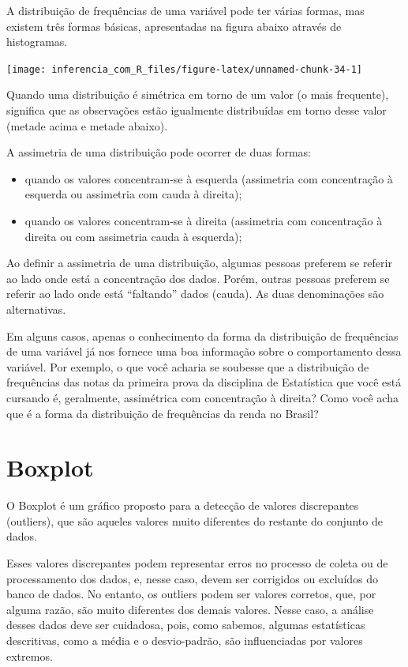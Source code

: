 \documentclass[
]{book}
\providecommand{\tightlist}{%
  \setlength{\itemsep}{0pt}\setlength{\parskip}{0pt}}
\begin{document}
A distribuição de frequências de uma variável pode ter várias formas, mas existem três formas básicas, apresentadas na figura abaixo através de histogramas.

\begin{center}\texttt{[image: inferencia\_com\_R\_files/figure-latex/unnamed-chunk-34-1]} \end{center}

Quando uma distribuição é simétrica em torno de um valor (o mais frequente), significa que as observações estão igualmente distribuídas em torno desse valor (metade acima e metade abaixo).

A assimetria de uma distribuição pode ocorrer de duas formas:

\begin{itemize}
\tightlist
\item
  quando os valores concentram-se à esquerda (assimetria com concentração à esquerda ou assimetria com cauda à direita);
\item
  quando os valores concentram-se à direita (assimetria com concentração à direita ou com assimetria cauda à esquerda);
\end{itemize}

Ao definir a assimetria de uma distribuição, algumas pessoas preferem se referir ao lado onde está a concentração dos dados. Porém, outras pessoas preferem se referir ao lado onde está ``faltando'' dados (cauda). As duas denominações são alternativas.

Em alguns casos, apenas o conhecimento da forma da distribuição de frequências de uma variável já nos fornece uma boa informação sobre o comportamento dessa variável. Por exemplo, o que você acharia se soubesse que a distribuição de frequências das notas da primeira prova da disciplina de Estatística que você está cursando é, geralmente, assimétrica com concentração à direita? Como você acha que é a forma da distribuição de frequências da renda no Brasil?

\hypertarget{boxplot}{%
\section{Boxplot}\label{boxplot}}

O Boxplot é um gráfico proposto para a detecção de valores discrepantes (outliers), que são aqueles valores muito diferentes do restante do conjunto de dados.

Esses valores discrepantes podem representar erros no processo de coleta ou de processamento dos dados, e, nesse caso, devem ser corrigidos ou excluídos do banco de dados. No entanto, os outliers podem ser valores corretos, que, por alguma razão, são muito diferentes dos demais valores. Nesse caso, a análise desses dados deve ser cuidadosa, pois, como sabemos, algumas estatísticas descritivas, como a média e o desvio-padrão, são influenciadas por valores extremos.
\end{document}
